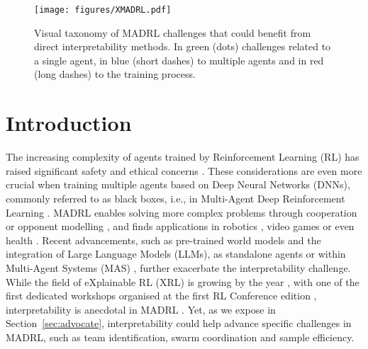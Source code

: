
\begin{figure}[t]
    \centering
    \texttt{[image: figures/XMADRL.pdf]}
    \caption{Visual taxonomy of MADRL challenges that could benefit from direct interpretability methods. In green (dots) challenges related to a single agent, in blue (short dashes) to multiple agents and in red (long dashes) to the training process.
    }
    \label{fig:xmadrl}
\end{figure}

\section{Introduction}
\label{sec:introduction}
The increasing complexity of agents trained by Reinforcement Learning (RL) has raised significant safety and ethical concerns \cite{mitelut2023intentaligned,shavit2023practices,Vishwanath2024ReinforcementLA}. These considerations are even more crucial when training multiple agents based on Deep Neural Networks (DNNs), commonly referred to as black boxes, i.e., in Multi-Agent Deep Reinforcement Learning \cite{Chelarescu2021DeceptionIS}. MADRL enables solving more complex problems through cooperation or opponent modelling \cite{HernandezLeal2018ASA,Gronauer2021MultiagentDR,Wong2021MultiagentDR}, and finds applications in robotics \cite{Orr2023MultiAgentDR}, video games \cite{Vinyals2019GrandmasterLI} or even health \cite{Shaik2023AdaptiveMD}.
Recent advancements, such as pre-trained world models \cite{Reed2022AGA,Yang2023FoundationMF, alonso2024diffusionworldmodelingvisual,Bruce2024GenieGI} and the integration of Large Language Models (LLMs), as standalone agents \cite{Wang2023ASO} or within Multi-Agent Systems (MAS) \cite{wu2023autogen,Li2024ASO,Han2024LLMMS}, further exacerbate the interpretability challenge.
While the field of eXplainable RL (XRL) is growing by the year \cite{Heuillet2020ExplainabilityID,Milani2023ExplainableRL,Qing2022ASO,Hickling2022ExplainabilityID,Bekkemoen2023ExplainableRL}, with one of the first dedicated workshops organised at the first RL Conference edition \cite{Kohler2024TowardsAR}, interpretability is anecdotal in MADRL \cite{Heuillet2021CollectiveEA,Wang2021SHAQIS,Milani2022MAVIPERLD, Zabounidis2023ConceptLF, Mahjoub2023EfficientlyQI,Khlifi2023OnDF}. Yet, as we expose in Section~\ref{sec:advocate}, interpretability could help advance specific challenges in MADRL, such as team identification, swarm coordination and sample efficiency.

